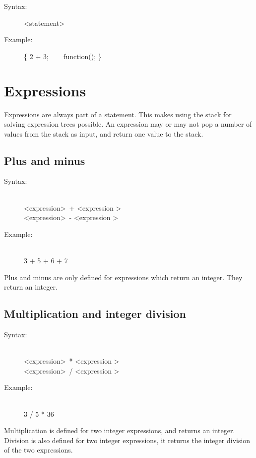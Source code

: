 \documentclass[10pt,a4paper]{report}
\begin{document}
\begin{description}
	\item[Syntax:] 
		\textless statement\textgreater
	\item[Example:] 
		\{ 2 + 3; ~~~ function(); \}
\end{description} 

\section{Expressions}
Expressions are always part of a statement. This makes using the stack for solving expression trees possible. An expression may or may not pop a number of values from the stack as input, and return one value to the stack. 

\subsection{Plus and minus}
\begin{description}
	\item[Syntax:] \hfill \\ 
		\textless expression\textgreater ~+ \textless expression \textgreater \\
		\textless expression\textgreater ~- \textless expression \textgreater
	\item[Example:] \hfill \\
		3 + 5 + 6 + 7 
\end{description} 
Plus and minus are only defined for expressions which return an integer. They return an integer.

\subsection{Multiplication and integer division}
\begin{description}
	\item[Syntax:] \hfill \\ 
		\textless expression\textgreater ~* \textless expression \textgreater \\
		\textless expression\textgreater ~/ \textless expression \textgreater
	\item[Example:] \hfill \\
		3 / 5 * 36
\end{description}
Multiplication is defined for two integer expressions, and returns an integer.
Division is also defined for two integer expressions, it returns the integer division of the two expressions. 
\end{document}
